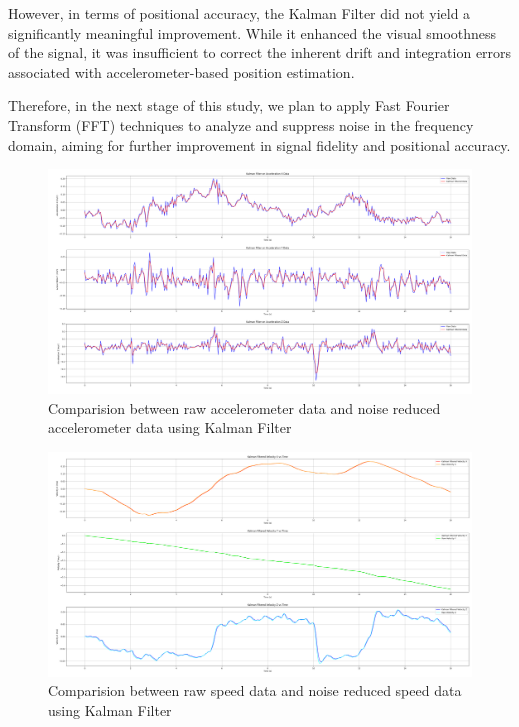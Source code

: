 \documentclass{article}
\begin{document}
However, in terms of positional accuracy, the Kalman Filter did not yield a significantly meaningful improvement. While it enhanced the visual smoothness of the signal, it was insufficient to correct the inherent drift and integration errors associated with accelerometer-based position estimation.

Therefore, in the next stage of this study, we plan to apply Fast Fourier Transform (FFT) techniques to analyze and suppress noise in the frequency domain, aiming for further improvement in signal fidelity and positional accuracy.

\FloatBarrier
\begin{figure}[h]
    \centering
    \includegraphics[width=\textwidth]{2_1_8_1.png}
    \caption{Comparision between raw accelerometer data and noise reduced accelerometer data using Kalman Filter}
    \label{fig:accel_kalman}
\end{figure}
\FloatBarrier
\begin{figure}[h]
    \centering
    \includegraphics[width=\textwidth]{2_1_8_2.png}
    \caption{Comparision between raw speed data and noise reduced speed data using Kalman Filter}
    \label{fig:speed_kalman}
\end{figure}
\end{document}
